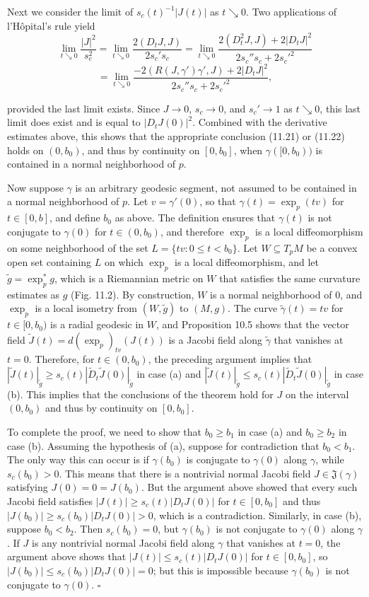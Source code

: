 Next we consider the limit of $s_c(t)^{-1}|J(t)|$ as $t \searrow 0$. Two applications of l'Hôpital's rule yield
$$\lim_{t\searrow 0} \frac{|J|^2}{s_c^2} = \lim_{t\searrow 0} \frac{2(D_t J, J)}{2s_c' s_c} = \lim_{t\searrow 0} \frac{2(D_t^2 J, J) + 2|D_t J|^2}{2s_c'' s_c + 2s_c'^2}$$
$$= \lim_{t\searrow 0} \frac{-2(R(J, \gamma')\gamma', J) + 2|D_t J|^2}{2s_c'' s_c + 2s_c'^2},$$

provided the last limit exists. Since $J \to 0$, $s_c \to 0$, and $s_c' \to 1$ as $t \searrow 0$, this last limit does exist and is equal to $|D_t J(0)|^2$. Combined with the derivative estimates above, this shows that the appropriate conclusion (11.21) or (11.22) holds on $(0, b_0)$, and thus by continuity on $[0, b_0]$, when $\gamma([0, b_0))$ is contained in a normal neighborhood of $p$.

Now suppose $\gamma$ is an arbitrary geodesic segment, not assumed to be contained in a normal neighborhood of $p$. Let $v = \gamma'(0)$, so that $\gamma(t) = \exp_p(tv)$ for $t \in [0, b]$, and define $b_0$ as above. The definition ensures that $\gamma(t)$ is not conjugate to $\gamma(0)$ for $t \in (0, b_0)$, and therefore $\exp_p$ is a local diffeomorphism on some neighborhood of the set $L = \{tv : 0 \leq t < b_0\}$. Let $W \subseteq T_p M$ be a convex open set containing $L$ on which $\exp_p$ is a local diffeomorphism, and let $\tilde{g} = \exp_p^* g$, which is a Riemannian metric on $W$ that satisfies the same curvature estimates as $g$ (Fig. 11.2). By construction, $W$ is a normal neighborhood of $0$, and $\exp_p$ is a local isometry from $(W, \tilde{g})$ to $(M, g)$. The curve $\tilde{\gamma}(t) = tv$ for $t \in [0, b_0)$ is a radial geodesic in $W$, and Proposition 10.5 shows that the vector field $\tilde{J}(t) = d(\exp_p)_{tv}(J(t))$ is a Jacobi field along $\tilde{\gamma}$ that vanishes at $t = 0$. Therefore, for $t \in (0, b_0)$, the preceding argument implies that $|\tilde{J}(t)|_{\tilde{g}} \geq s_c(t)|\tilde{D}_t\tilde{J}(0)|_{\tilde{g}}$ in case (a) and $|\tilde{J}(t)|_{\tilde{g}} \leq s_c(t)|\tilde{D}_t\tilde{J}(0)|_{\tilde{g}}$ in case (b). This implies that the conclusions of the theorem hold for $J$ on the interval $(0, b_0)$ and thus by continuity on $[0, b_0]$.

To complete the proof, we need to show that $b_0 \geq b_1$ in case (a) and $b_0 \geq b_2$ in case (b). Assuming the hypothesis of (a), suppose for contradiction that $b_0 < b_1$. The only way this can occur is if $\gamma(b_0)$ is conjugate to $\gamma(0)$ along $\gamma$, while $s_c(b_0) > 0$. This means that there is a nontrivial normal Jacobi field $J \in \mathfrak{J}(\gamma)$ satisfying $J(0) = 0 = J(b_0)$. But the argument above showed that every such Jacobi field satisfies $|J(t)| \geq s_c(t)|D_t J(0)|$ for $t \in [0, b_0]$ and thus $|J(b_0)| \geq s_c(b_0)|D_t J(0)| > 0$, which is a contradiction. Similarly, in case (b), suppose $b_0 < b_2$. Then $s_c(b_0) = 0$, but $\gamma(b_0)$ is not conjugate to $\gamma(0)$ along $\gamma$. If $J$ is any nontrivial normal Jacobi field along $\gamma$ that vanishes at $t = 0$, the argument above shows that $|J(t)| \leq s_c(t)|D_t J(0)|$ for $t \in [0, b_0]$, so $|J(b_0)| \leq s_c(b_0)|D_t J(0)| = 0$; but this is impossible because $\gamma(b_0)$ is not conjugate to $\gamma(0)$. $\square$

